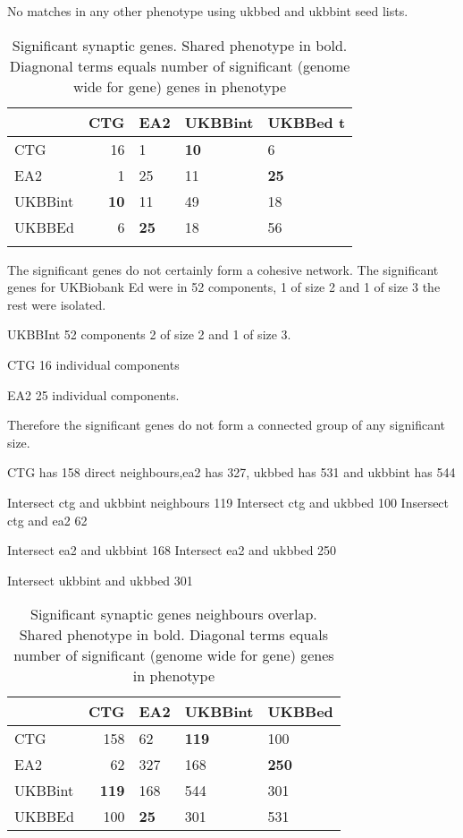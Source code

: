  No matches in any other phenotype using ukbbed and ukbbint seed lists.
 \begin{table}[ht]
\centering
\begin{tabular}{lrlll}
  \hline
  &CTG & EA2 &UKBBint & UKBBed t\\ 
  \hline
 CTG & 16 &1 & \textbf{10}& 6\\
 EA2 & 1 & 25 & 11 & \textbf{25}\\
 UKBBint &\textbf{10}  & 11 & 49 & 18\\
  UKBBEd & 6  & \textbf{25} & 18 & 56\\
  \\ 
 
   \hline
\end{tabular}
\caption{Significant synaptic genes. Shared phenotype in bold. Diagnonal terms equals number of significant (genome wide for gene) genes in phenotype}
\label{table:MAGMA_Gene_result_significant neighbour overlap synaptic genes}
\end{table}
 
 The significant genes do not certainly form a cohesive network. The significant genes for UKBiobank Ed were in 52 components, 1 of size 2 and 1 of size 3 the rest were isolated. 
 
 UKBBInt 52 components 2 of size 2 and 1 of size 3.
 
 CTG 16 individual components
 
 EA2 25 individual components. 
 
 Therefore the significant genes do not form a connected group of any significant size.
 
 
 CTG has 158 direct neighbours,ea2 has 327, ukbbed has 531 and ukbbint has 544
 
 Intersect ctg and ukbbint neighbours 119
 Intersect ctg and ukbbed 100
 Insersect ctg and ea2 62
 
 Intersect ea2 and ukbbint 168
 Intersect ea2 and ukbbed 250
 
 Intersect ukbbint and ukbbed 301
 
  \begin{table}[ht]
\centering
\begin{tabular}{lrlll}
  \hline
  &CTG & EA2 &UKBBint & UKBBed \\ 
  \hline
 CTG & 158 &62 & \textbf{119}& 100\\
 EA2 & 62 & 327 & 168 & \textbf{250}\\
 UKBBint &\textbf{119}  & 168 & 544 & 301\\
  UKBBEd & 100  & \textbf{25} & 301 & 531\\
  \hline
\end{tabular}
\caption{Significant synaptic genes neighbours overlap. Shared phenotype in bold. Diagonal terms equals number of significant (genome wide for gene) genes in phenotype}
\label{table:MAGMA_Gene_result_significant_synaptic_genes_neighbours_overlap}
\end{table}


